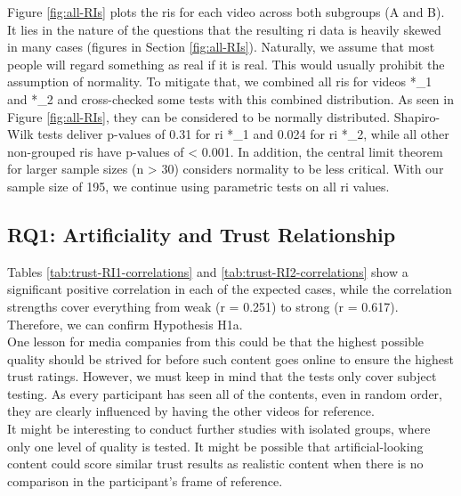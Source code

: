 \documentclass[
  a4paper,  %
  twoside,  %
  bibliography=totoc,
  headsepline,
  cleardoublepage=empty,
  parskip=half,
  draft=false
]{scrbook}
\begin{document}
Figure \ref{fig:all-RIs} plots the \gls{ri}s for each video across both subgroups (A and B). \\
It lies in the nature of the questions that the resulting \gls{ri} data is heavily skewed in many cases (figures in Section \ref{fig:all-RIs}). Naturally, we assume that most people will regard something as real if it is real. This would usually prohibit the assumption of normality. To mitigate that, we combined all \gls{ri}s for videos *\_1 and *\_2 and cross-checked some tests with this combined distribution. As seen in Figure \ref{fig:all-RIs}, they can be considered to be normally distributed. Shapiro-Wilk tests deliver p-values of 0.31 for \gls{ri} *\_1 and 0.024 for \gls{ri} *\_2, while all other non-grouped \gls{ri}s have p-values of < 0.001. In addition, the central limit theorem for larger sample sizes (n > 30) considers normality to be less critical. With our sample size of 195, we continue using parametric tests on all \gls{ri} values.

\subsection{RQ1: Artificiality and Trust Relationship}
\label{subsec:RQ1}

Tables \ref{tab:trust-RI1-correlations} and \ref{tab:trust-RI2-correlations} show a significant positive correlation in each of the expected cases, while the correlation strengths cover everything from weak (r = 0.251) to strong (r = 0.617). Therefore, we can confirm Hypothesis H1a. \\
One lesson for media companies from this could be that the highest possible quality should be strived for before such content goes online to ensure the highest trust ratings. However, we must keep in mind that the tests only cover subject testing. As every participant has seen all of the contents, even in random order, they are clearly influenced by having the other videos for reference. \\
It might be interesting to conduct further studies with isolated groups, where only one level of quality is tested. It might be possible that artificial-looking content could score similar trust results as realistic content when there is no comparison in the participant's frame of reference.
\end{document}
